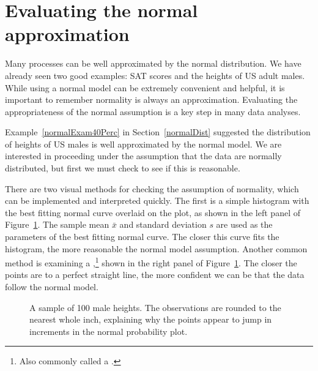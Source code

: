 \section{Evaluating the normal approximation}
\label{assessingNormal}

Many processes can be well approximated by the normal distribution.
We have already seen two good examples:
SAT scores and the heights of US adult males.
While using a normal model can be extremely convenient
and helpful, it is important to remember normality is
always an approximation.
Evaluating the appropriateness of the normal assumption
is a key step in many data analyses.


Example~\ref{normalExam40Perc} in Section~\ref{normalDist}
suggested the distribution of heights of US males is well
approximated by the normal model.
We are interested in proceeding under the assumption that
the data are normally distributed, but first we must check
to see if this is reasonable.

There are two visual methods for checking the assumption of
normality, which can be implemented and interpreted quickly.
The first is a simple histogram with the best fitting normal
curve overlaid on the plot, as shown in the left panel of
Figure~\ref{fcidMHeights}.
The sample mean $\bar{x}$ and standard deviation $s$ are used
as the parameters of the best fitting normal curve.
The closer this curve fits the histogram, the more reasonable
the normal model assumption.
Another common method is examining a
,\footnote{Also commonly
  called a .}
shown in the right panel of Figure~\ref{fcidMHeights}.
The closer the points are to a perfect straight line,
the more confident we can be that the data follow the
normal model.

\begin{figure}[h]
  \centering
  \caption{A sample of 100 male heights.
      The observations are rounded to the nearest whole inch,
      explaining why the points appear to jump in increments
      in the normal probability plot.}
  \label{fcidMHeights}
\end{figure}

